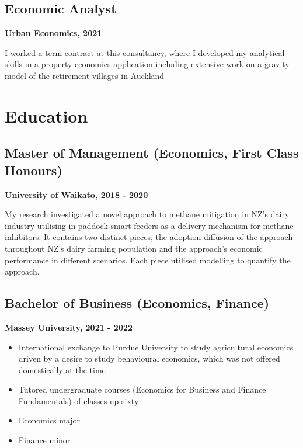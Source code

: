 \documentclass[11pt,a4paper,]{moderncv}
\providecommand{\tightlist}{%
	\setlength{\itemsep}{0pt}\setlength{\parskip}{0pt}}
\begin{document}
\subsection{Economic Analyst}\label{economic-analyst}

\textbf{Urban Economics, 2021} \newline

I worked a term contract at this consultancy, where I developed my
analytical skills in a property economics application including
extensive work on a gravity model of the retirement villages in Auckland

\section{Education}\label{education}

\subsection{Master of Management (Economics, First Class
Honours)}\label{master-of-management-economics-first-class-honours}

\textbf{University of Waikato, 2018 - 2020}

My research investigated a novel approach to methane mitigation in NZ's
dairy industry utilising in-paddock smart-feeders as a delivery
mechanism for methane inhibitors. It contains two distinct pieces, the
adoption-diffusion of the approach throughout NZ's dairy farming
population and the approach's economic performance in different
scenarios. Each piece utilised modelling to quantify the approach.

\subsection{Bachelor of Business (Economics,
Finance)}\label{bachelor-of-business-economics-finance}

\textbf{Massey University, 2021 - 2022}

\begin{itemize}
\tightlist
\item
  International exchange to Purdue University to study agricultural
  economics driven by a desire to study behavioural economics, which was
  not offered domestically at the time
\item
  Tutored undergraduate courses (Economics for Business and Finance
  Fundamentals) of classes up sixty
\item
  Economics major
\item
  Finance minor
\end{itemize}
\end{document}

